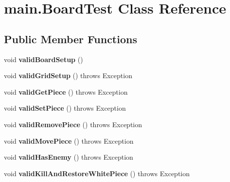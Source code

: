 \hypertarget{classmain_1_1_board_test}{}\section{main.\+Board\+Test Class Reference}
\label{classmain_1_1_board_test}
\subsection*{Public Member Functions}
\begin{DoxyCompactItemize}
\item 
\mbox{\label{classmain_1_1_board_test_a9b8fcc518074d9ea2a13601c4f352b72}} 
void {\bfseries valid\+Board\+Setup} ()
\item 
\mbox{\label{classmain_1_1_board_test_a9b02978297ae3c80d394e36265332367}} 
void {\bfseries valid\+Grid\+Setup} ()  throws Exception 
\item 
\mbox{\label{classmain_1_1_board_test_a6471ffb2e18931b56a856f718cf39044}} 
void {\bfseries valid\+Get\+Piece} ()  throws Exception 
\item 
\mbox{\label{classmain_1_1_board_test_a9f09cb9bf7006334386dc480cb6d349c}} 
void {\bfseries valid\+Set\+Piece} ()  throws Exception 
\item 
\mbox{\label{classmain_1_1_board_test_acb8e709097fb7749271b6ef1ab21826e}} 
void {\bfseries valid\+Remove\+Piece} ()  throws Exception 
\item 
\mbox{\label{classmain_1_1_board_test_a5ed9bd8ff37ef28fc4a926f59d862d8f}} 
void {\bfseries valid\+Move\+Piece} ()  throws Exception 
\item 
\mbox{\label{classmain_1_1_board_test_a9f65c6006a0784b79ec4b4023e8524ea}} 
void {\bfseries valid\+Has\+Enemy} ()  throws Exception 
\item 
\mbox{\label{classmain_1_1_board_test_abdea4b861e26c7a0de09279dae2a3582}} 
void {\bfseries valid\+Kill\+And\+Restore\+White\+Piece} ()  throws Exception 

\end{DoxyCompactItemize}
